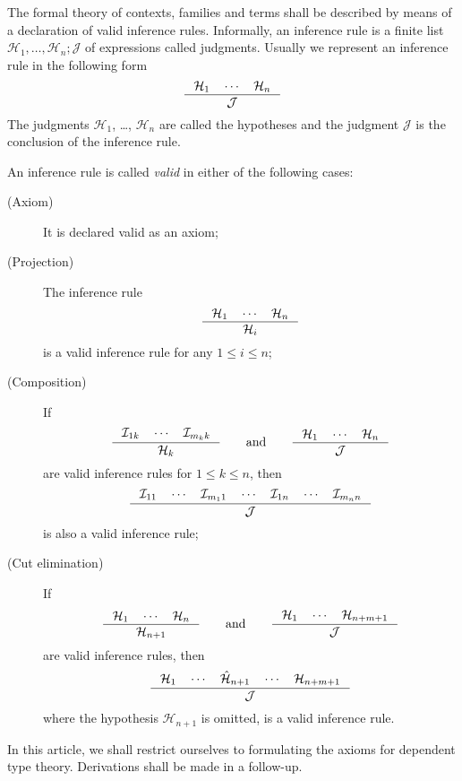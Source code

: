 \documentclass{article}
\begin{document}
The formal theory of contexts, families and terms shall be described by means of a
declaration of valid inference rules. Informally, an inference rule is a finite list
$\mathcal{H}_1,\ldots,\mathcal{H}_n;\mathcal{J}$ of expressions called
judgments. Usually we represent an inference rule in the following
form
\begin{equation*}
\inference{\mathcal{H}_1\quad\cdots\quad\mathcal{H}_n}{\mathcal{J}}
\end{equation*}
The judgments $\mathcal{H}_1$, \ldots, $\mathcal{H}_n$ are called the
hypotheses and the judgment $\mathcal{J}$ is the conclusion of the inference
rule.

An inference rule is called \emph{valid} in either of the following cases:
\begin{description}
\item[(Axiom)] It is declared valid as an axiom;
\item[(Projection)] The inference rule
\begin{equation*}
\inference{\mathcal{H}_1\quad\cdots\quad\mathcal{H}_n}{\mathcal{H}_i}
\end{equation*}
is a valid inference rule for any $1\leq i\leq n$;
\item[(Composition)] If
\begin{equation*}
\inference{\mathcal{I}_{1k}\quad\cdots\quad\mathcal{I}_{m_kk}}{\mathcal{H}_k}
\qquad\text{and}\qquad
\inference{\mathcal{H}_1\quad\cdots\quad\mathcal{H}_n}{\mathcal{J}}
\end{equation*}
are valid inference rules for $1\leq k\leq n$, then
\begin{equation*}
\inference{\mathcal{I}_{11}\quad\cdots\quad\mathcal{I}_{m_11}\quad\cdots\quad\mathcal{I}_{1n}\quad\cdots\quad\mathcal{I}_{m_nn}}{\mathcal{J}}
\end{equation*}
is also a valid inference rule;
\item[(Cut elimination)] If
\begin{equation*}
\inference{\mathcal{H}_1\quad\cdots\quad\mathcal{H}_n}{\mathcal{H}_{n+1}}
\qquad
\text{and}
\qquad
\inference{\mathcal{H}_1\quad\cdots\quad\mathcal{H}_{n+m+1}}{\mathcal{J}}
\end{equation*}
are valid inference rules, then
\begin{equation*}
\inference{\mathcal{H}_1\quad\cdots\quad\hat{\mathcal{H}}_{n+1}\quad\cdots\quad\mathcal{H}_{n+m+1}}{\mathcal{J}}
\end{equation*}
where the hypothesis $\mathcal{H}_{n+1}$ is omitted, is a valid inference rule.
\end{description}
In this article, we shall restrict ourselves to formulating the axioms for
dependent type theory. Derivations shall be made in a follow-up.
\end{document}
